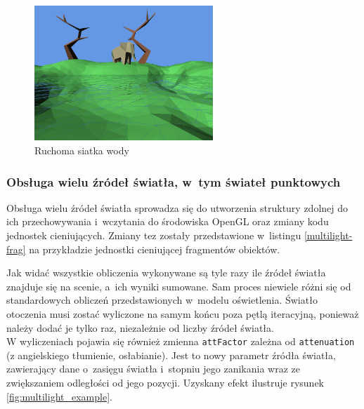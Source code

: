 \documentclass[a4paper,twoside,12pt]{book}
\begin{document}
\begin{itemize}
    \begin{figure}[H]
        \centering
        \includegraphics[width=0.6\textwidth]{res/water_vertices.png}
        \caption{Ruchoma siatka wody}
        \label{fig:water_vertices}
    \end{figure}
    
\end{itemize}

\subsubsection{Obsługa wielu źródeł światła, w~tym świateł punktowych}
Obsługa wielu źródeł światła sprowadza się do utworzenia struktury zdolnej do ich przechowywania i~wczytania do środowiska OpenGL oraz zmiany kodu jednostek cieniujących. Zmiany tez zostały przedstawione w~listingu \ref{multilight-frag} na przykładzie jednostki cieniującej fragmentów obiektów. 



Jak widać wszystkie obliczenia wykonywane są tyle razy ile źródeł światła znajduje się na scenie, a~ich wyniki sumowane. Sam proces niewiele różni się od standardowych obliczeń przedstawionych w~modelu oświetlenia. Światło otoczenia musi zostać wyliczone na samym końcu poza pętlą iteracyjną, ponieważ należy dodać je tylko raz, niezależnie od liczby źródeł światła.\\
W wyliczeniach pojawia się również zmienna \texttt{attFactor} zależna od \texttt{attenuation} (z angielskiego tłumienie, osłabianie). Jest to nowy parametr źródła światła, zawierający dane o~zasięgu światła i~stopniu jego zanikania wraz ze zwiększaniem odległości od jego pozycji. Uzyskany efekt ilustruje rysunek \ref{fig:multilight_example}.
\end{document}
